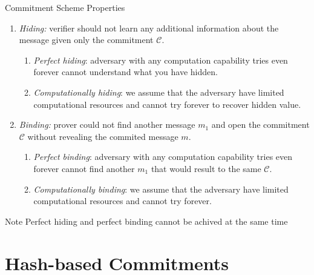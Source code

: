 \documentclass[xcolor={usenames,dvipsnames}]{beamer}
\begin{document}
    \begin{frame}{Commitment Scheme Properties}
        \begin{definition}
            \begin{enumerate}
                \item \textit{Hiding: } verifier should not learn any additional information about the message given only the commitment $\mathcal{C}$.
                \begin{enumerate}
                    \item \textit{Perfect hiding}: adversary with any computation capability tries even forever cannot understand what you have hidden.
                    \item \textit{Computationally hiding}: we assume that the adversary have limited computational resources and cannot try forever to recover hidden value.
                \end{enumerate}
                
                \item \textit{Binding: } prover could not find another message $m_1$ and open the commitment $\mathcal{C}$ without revealing the commited message $m$.
                \begin{enumerate}
                    \item \textit{Perfect binding}: adversary with any computation capability tries even forever cannot find another $m_1$ that would result to the same $\mathcal{C}$.
                    \item \textit{Computationally binding}: we assume that the adversary have limited computational resources and cannot try forever.
                \end{enumerate}
            \end{enumerate}
        \end{definition}
        \begin{alertblock}{Note}
            Perfect hiding and perfect binding cannot be achived at the same time
        \end{alertblock}    
    \end{frame}

    \section{Hash-based Commitments}
\end{document}
